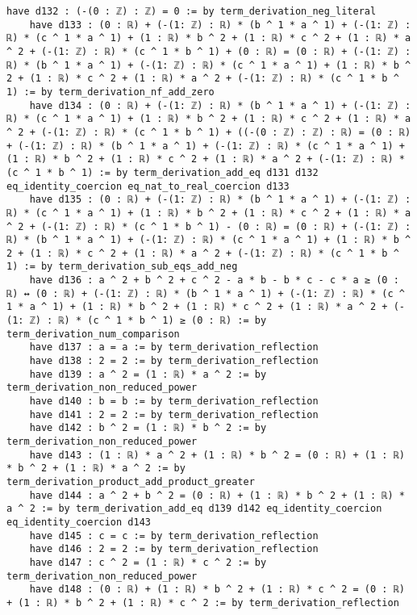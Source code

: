 \documentclass{article}
\begin{document}
\begin{tcolorbox}[colback=white!10, width=\linewidth]
\begin{lstlisting}[language=Lean4]
    have d132 : (-(0 : ℤ) : ℤ) = 0 := by term_derivation_neg_literal
    have d133 : (0 : ℝ) + (-(1: ℤ) : ℝ) * (b ^ 1 * a ^ 1) + (-(1: ℤ) : ℝ) * (c ^ 1 * a ^ 1) + (1 : ℝ) * b ^ 2 + (1 : ℝ) * c ^ 2 + (1 : ℝ) * a ^ 2 + (-(1: ℤ) : ℝ) * (c ^ 1 * b ^ 1) + (0 : ℝ) = (0 : ℝ) + (-(1: ℤ) : ℝ) * (b ^ 1 * a ^ 1) + (-(1: ℤ) : ℝ) * (c ^ 1 * a ^ 1) + (1 : ℝ) * b ^ 2 + (1 : ℝ) * c ^ 2 + (1 : ℝ) * a ^ 2 + (-(1: ℤ) : ℝ) * (c ^ 1 * b ^ 1) := by term_derivation_nf_add_zero
    have d134 : (0 : ℝ) + (-(1: ℤ) : ℝ) * (b ^ 1 * a ^ 1) + (-(1: ℤ) : ℝ) * (c ^ 1 * a ^ 1) + (1 : ℝ) * b ^ 2 + (1 : ℝ) * c ^ 2 + (1 : ℝ) * a ^ 2 + (-(1: ℤ) : ℝ) * (c ^ 1 * b ^ 1) + ((-(0 : ℤ) : ℤ) : ℝ) = (0 : ℝ) + (-(1: ℤ) : ℝ) * (b ^ 1 * a ^ 1) + (-(1: ℤ) : ℝ) * (c ^ 1 * a ^ 1) + (1 : ℝ) * b ^ 2 + (1 : ℝ) * c ^ 2 + (1 : ℝ) * a ^ 2 + (-(1: ℤ) : ℝ) * (c ^ 1 * b ^ 1) := by term_derivation_add_eq d131 d132 eq_identity_coercion eq_nat_to_real_coercion d133
    have d135 : (0 : ℝ) + (-(1: ℤ) : ℝ) * (b ^ 1 * a ^ 1) + (-(1: ℤ) : ℝ) * (c ^ 1 * a ^ 1) + (1 : ℝ) * b ^ 2 + (1 : ℝ) * c ^ 2 + (1 : ℝ) * a ^ 2 + (-(1: ℤ) : ℝ) * (c ^ 1 * b ^ 1) - (0 : ℝ) = (0 : ℝ) + (-(1: ℤ) : ℝ) * (b ^ 1 * a ^ 1) + (-(1: ℤ) : ℝ) * (c ^ 1 * a ^ 1) + (1 : ℝ) * b ^ 2 + (1 : ℝ) * c ^ 2 + (1 : ℝ) * a ^ 2 + (-(1: ℤ) : ℝ) * (c ^ 1 * b ^ 1) := by term_derivation_sub_eqs_add_neg
    have d136 : a ^ 2 + b ^ 2 + c ^ 2 - a * b - b * c - c * a ≥ (0 : ℝ) ↔ (0 : ℝ) + (-(1: ℤ) : ℝ) * (b ^ 1 * a ^ 1) + (-(1: ℤ) : ℝ) * (c ^ 1 * a ^ 1) + (1 : ℝ) * b ^ 2 + (1 : ℝ) * c ^ 2 + (1 : ℝ) * a ^ 2 + (-(1: ℤ) : ℝ) * (c ^ 1 * b ^ 1) ≥ (0 : ℝ) := by term_derivation_num_comparison
    have d137 : a = a := by term_derivation_reflection
    have d138 : 2 = 2 := by term_derivation_reflection
    have d139 : a ^ 2 = (1 : ℝ) * a ^ 2 := by term_derivation_non_reduced_power
    have d140 : b = b := by term_derivation_reflection
    have d141 : 2 = 2 := by term_derivation_reflection
    have d142 : b ^ 2 = (1 : ℝ) * b ^ 2 := by term_derivation_non_reduced_power
    have d143 : (1 : ℝ) * a ^ 2 + (1 : ℝ) * b ^ 2 = (0 : ℝ) + (1 : ℝ) * b ^ 2 + (1 : ℝ) * a ^ 2 := by term_derivation_product_add_product_greater
    have d144 : a ^ 2 + b ^ 2 = (0 : ℝ) + (1 : ℝ) * b ^ 2 + (1 : ℝ) * a ^ 2 := by term_derivation_add_eq d139 d142 eq_identity_coercion eq_identity_coercion d143
    have d145 : c = c := by term_derivation_reflection
    have d146 : 2 = 2 := by term_derivation_reflection
    have d147 : c ^ 2 = (1 : ℝ) * c ^ 2 := by term_derivation_non_reduced_power
    have d148 : (0 : ℝ) + (1 : ℝ) * b ^ 2 + (1 : ℝ) * c ^ 2 = (0 : ℝ) + (1 : ℝ) * b ^ 2 + (1 : ℝ) * c ^ 2 := by term_derivation_reflection

\end{lstlisting}
\end{tcolorbox}
\end{document}
